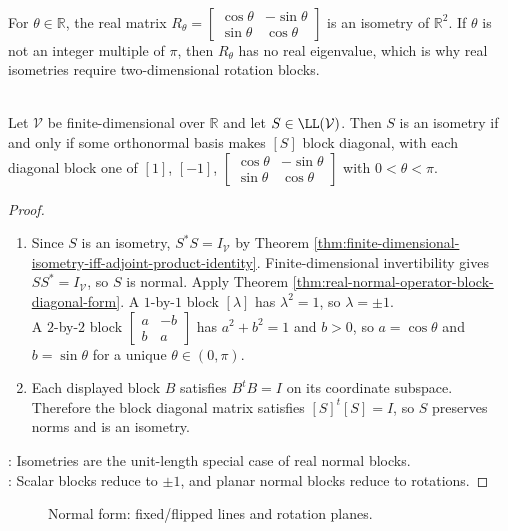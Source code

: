 \begin{example} \label{ex:plane-rotation-isometry} \\
For $\theta\in\mathbb{R}$, the real matrix $R_{\theta}=
\begin{bmatrix}
\cos\theta&-\sin\theta\\
\sin\theta&\cos\theta
\end{bmatrix}$ is an isometry of $\mathbb{R}^2$. If $\theta$ is not an integer multiple of $\pi$, then $R_{\theta}$ has no real eigenvalue, which is why real isometries require two-dimensional rotation blocks.
\end{example}

\begin{theorem} \label{thm:real-isometry-block-diagonal-form} \\
Let $\mathcal{V}$ be finite-dimensional over $\mathbb{R}$ and let $S\in\LL(\mathcal{V})$. Then $S$ is an isometry if and only if some orthonormal basis makes $[S]$ block diagonal, with each diagonal block one of $[1]$, $[-1]$, $\begin{bmatrix}
\cos\theta&-\sin\theta\\
\sin\theta&\cos\theta
\end{bmatrix}$ with $0<\theta<\pi$.
\begin{proof}
\begin{enumerate}[label=\roman*.]
\setlength{\itemsep}{0pt}
\item[$(\Rightarrow)$] Since $S$ is an isometry, $S^*S=I_{\mathcal{V}}$ by Theorem \ref{thm:finite-dimensional-isometry-iff-adjoint-product-identity}. Finite-dimensional invertibility gives $SS^*=I_{\mathcal{V}}$, so $S$ is normal. Apply Theorem \ref{thm:real-normal-operator-block-diagonal-form}. A $1$-by-$1$ block $[\lambda]$ has $\lambda^2=1$, so $\lambda=\pm1$.\\
A $2$-by-$2$ block $\begin{bmatrix}a&-b\\b&a\end{bmatrix}$ has $a^2+b^2=1$ and $b>0$, so $a=\cos\theta$ and $b=\sin\theta$ for a unique $\theta\in(0,\pi)$.
\item[$(\Leftarrow)$] Each displayed block $B$ satisfies $B^tB=I$ on its coordinate subspace. Therefore the block diagonal matrix satisfies $[S]^t[S]=I$, so $S$ preserves norms and is an isometry.
\end{enumerate}
: Isometries are the unit-length special case of real normal blocks.\\
: Scalar blocks reduce to $\pm1$, and planar normal blocks reduce to rotations.
\end{proof}
\end{theorem}

\begin{figure}[H]
  \centering
  
  \caption{Normal form: fixed/flipped lines and rotation planes.}
  \label{fig:real-isometry-blocks}
\end{figure}
